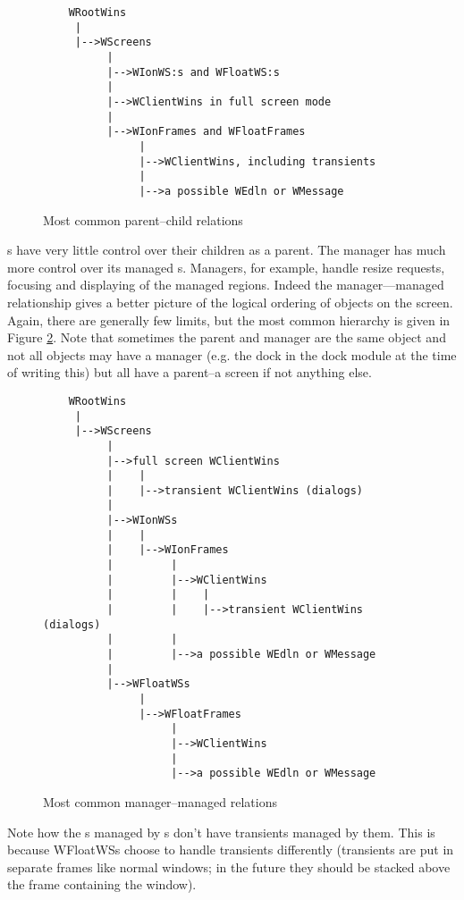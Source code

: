 \begin{figure}
\begin{verbatim}
    WRootWins
     |
     |-->WScreens
          |
          |-->WIonWS:s and WFloatWS:s
          |
          |-->WClientWins in full screen mode
          |
          |-->WIonFrames and WFloatFrames
               |
               |-->WClientWins, including transients
               |
               |-->a possible WEdln or WMessage
\end{verbatim}
\caption{Most common parent--child relations}
\label{fig:parentship}
\end{figure}

s have very little control over their children as a parent.
The manager  has much more control over its
managed s. Managers, for example, handle resize requests,
focusing and displaying of the managed regions. Indeed the manager---managed
relationship gives a better picture of the logical ordering of objects on
the screen. Again, there are generally few limits, but the most common
hierarchy is given in Figure \ref{fig:managership}. Note that sometimes
the parent and manager are the same object and not all objects may have
a manager (e.g. the dock in the dock module at the time of writing this)
but all have a parent--a screen if not anything else.

\begin{figure}
\begin{verbatim}
    WRootWins
     |
     |-->WScreens
          |
          |-->full screen WClientWins
          |    |
          |    |-->transient WClientWins (dialogs)
          |
          |-->WIonWSs
          |    |
          |    |-->WIonFrames
          |         |
          |         |-->WClientWins
          |         |    |
          |         |    |-->transient WClientWins (dialogs)
          |         |
          |         |-->a possible WEdln or WMessage
          |
          |-->WFloatWSs
               |
               |-->WFloatFrames
                    |
                    |-->WClientWins
                    |
                    |-->a possible WEdln or WMessage
\end{verbatim}
\caption{Most common manager--managed relations}
\label{fig:managership}
\end{figure}

Note how the s managed by s don't have
transients managed by them. This is because WFloatWSs choose to handle
transients differently (transients are put in separate frames like normal
windows; in the future they should be stacked above the frame containing the
 window).
